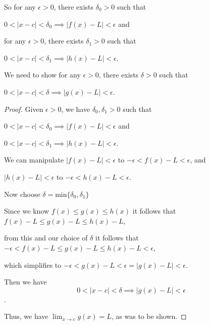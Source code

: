 \documentclass[12pt,letterpaper]{article}
\begin{document}
\begin{enumerate}[label=Exercise 4.2.\arabic*]
        So for any $\epsilon > 0$, there exists $\delta_0 > 0$ such that

        $0 < \left|x - c\right| < \delta_0 \implies \left|f(x) - L\right| < \epsilon$ and

        for any $\epsilon > 0$, there exists $\delta_1 > 0$ such that

        $0 < \left|x - c\right| < \delta_1 \implies \left|h(x) - L\right| < \epsilon$.

        We need to show for any $\epsilon > 0$, there exists $\delta > 0$ such that

        $0 < \left|x - c\right| < \delta \implies \left|g(x) - L\right| < \epsilon$.

      \begin{proof}
        Given $\epsilon > 0$, we have $\delta_0, \delta_1 > 0$ such that

        $0 < \left|x - c\right| < \delta_0 \implies \left|f(x) - L\right| < \epsilon$ and

        $0 < \left|x - c\right| < \delta_1 \implies \left|h(x) - L\right| < \epsilon$.

        We can manipulate $\left|f(x) - L\right| < \epsilon$ to
        $-\epsilon < f(x) - L < \epsilon$, and

        $\left|h(x) - L\right| < \epsilon$ to
        $-\epsilon < h(x) - L < \epsilon$.

        Now choose $\delta = \text{min}\{\delta_0, \delta_1\}$

        Since we know $f(x) \le g(x) \le h(x)$
        it follows that $f(x) - L \le g(x) - L \le h(x) - L$,

        from this and our choice of $\delta$ it follows that $-\epsilon < f(x) - L \le g(x) - L \le h(x) - L < \epsilon$,

        which simplifies to $-\epsilon < g(x) - L < \epsilon = \left|g(x) - L\right| < \epsilon$.

        Then we have
        \[
          0 < \left|x - c\right| < \delta \implies \left|g(x) - L\right| < \epsilon
        \].

        Thus, we have $\lim_{x \to c} g(x) = L$, as was to be shown.

      \end{proof}

  \end{enumerate}
\end{document}
